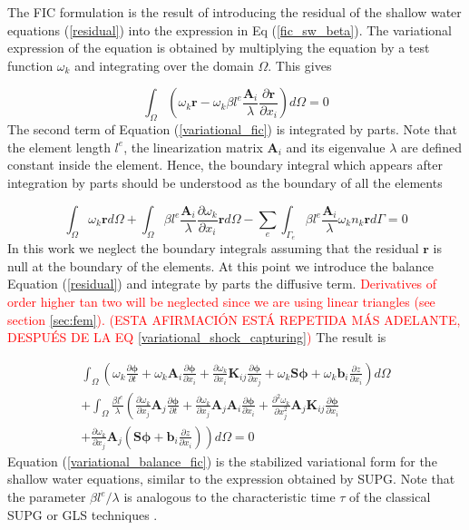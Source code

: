 \documentclass[a4paper,12pt]{elsarticle}
\newcommand{\Miguel}[1]{\textcolor{red}{#1}}
\newcommand{\pder}[2]{\frac{\partial#1}{\partial#2}}
\newcommand{\ppder}[2]{\frac{\partial^2#1}{\partial#2^2}}
\begin{document}
The FIC formulation is the result of introducing the residual of the shallow water equations (\ref{residual}) into the expression in Eq (\ref{fic_sw_beta}). The variational expression of the equation is obtained by multiplying the equation by a test function $\omega_k$ and integrating over the domain $\Omega$. This gives

\begin{equation} \label{variational_fic}
\int_\Omega \left(
    \omega_k \mathbf{r} - \omega_k \beta l^e\frac{\mathbf{A}_i}{\lambda}\pder{\mathbf{r}}{x_i}
\right) d\Omega = 0
\end{equation}
The second term of Equation (\ref{variational_fic}) is integrated by parts. Note that the element length $l^e$, the linearization matrix $\mathbf{A}_i$ and its eigenvalue $\lambda$ are defined constant inside the element. Hence, the boundary integral which appears after integration by parts should be understood as the boundary of all the elements

\begin{equation} \label{variational_fic_parts}
\int_\Omega \omega_k \mathbf{r} d\Omega
+ \int_\Omega \beta l^e\frac{\mathbf{A}_i}{\lambda}\pder{\omega_k}{x_i} \mathbf{r} d\Omega
- \sum_e \int_{\Gamma_e} \beta l^e\frac{\mathbf{A}_i}{\lambda}\omega_kn_k \mathbf{r} d\Gamma = 0
\end{equation}
In this work we neglect the boundary integrals assuming that the residual $\mathbf{r}$ is null at the boundary of the elements. At this point we introduce the balance Equation (\ref{residual}) and integrate by parts the diffusive term.
\Miguel{
Derivatives of order higher tan two will be neglected since we are using linear triangles (see section \ref{sec:fem}).
} \Miguel{\footnotesize (ESTA AFIRMACIÓN ESTÁ REPETIDA MÁS ADELANTE, DESPUÉS DE LA EQ \ref{variational_shock_capturing})}
The result is

\begin{multline} \label{variational_balance_fic}
\int_\Omega \left(
    \omega_k \pder{\bm{\phi}}{t} + \omega_k \mathbf{A}_i\pder{\bm{\phi}}{x_i}
    + \pder{\omega_k}{x_i} \mathbf{K}_{ij} \pder{\bm{\phi}}{x_j} + \omega_k \mathbf{S}\bm{\phi} + \omega_k \mathbf{b}_i\pder{z}{x_i}
\right) d\Omega\\ +
\int_\Omega \frac{\beta l^e}{\lambda} \left(
    \pder{\omega_k}{x_j} \mathbf{A}_j \pder{\bm{\phi}}{t}
    + \pder{\omega_k}{x_j} \mathbf{A}_j\mathbf{A}_i\pder{\bm{\phi}}{x_i}
    + \ppder{\omega_k}{x_j} \mathbf{A}_j\mathbf{K}_{ij} \pder{\bm{\phi}}{x_i} \right. \\
    \left.
    + \pder{\omega_k}{x_j} \mathbf{A}_j \left( \mathbf{S}\bm{\phi} + \mathbf{b}_i\pder{z}{x_i} \right)
\right) d\Omega
=0
\end{multline}
Equation (\ref{variational_balance_fic}) is the stabilized variational form for the shallow water equations, similar to the expression obtained by SUPG. Note that the parameter $\beta l^e/\lambda$ is analogous to the characteristic time $\tau$ of the classical SUPG or GLS techniques \cite{cotela2016}.
\end{document}
